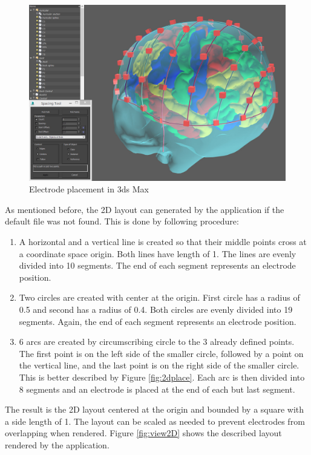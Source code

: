 \begin{figure}[htb]
	\centering
	\includegraphics[width=1\linewidth]{fig/3DSMaxPlacement.jpg}
	\caption{Electrode placement in 3ds Max}
	\label{fig:3DSMaxPlacement}
\end{figure}

As mentioned before, the 2D layout can generated by the application if the default file was not found. This is done by following procedure:
\begin{enumerate}
	\item A horizontal and a vertical line is created so that their middle points cross at a coordinate space origin. Both lines have length of 1. The lines are evenly divided into 10 segments. The end of each segment represents an electrode position.
	\item Two circles are created with center at the origin. First circle has a radius of 0.5 and second has a radius of 0.4. Both circles are evenly divided into 19 segments. Again, the end of each segment represents an electrode position.
	\item 6 arcs are created by circumscribing circle to the 3 already defined points. The first point is on the left side of the smaller circle, followed by a point on the vertical line, and the last point is on the right side of the smaller circle. This is better described by Figure \ref{fig:2dplace}. Each arc is then divided into 8 segments and an electrode is placed at the end of each but last segment. 
\end{enumerate}
The result is the 2D layout centered at the origin and bounded by a square with a side length of 1. The layout can be scaled as needed to prevent electrodes from overlapping when rendered. Figure \ref{fig:view2D} shows the described layout rendered by the application. 

